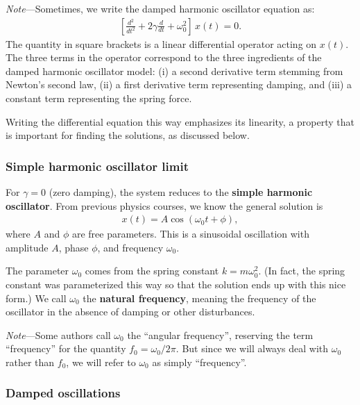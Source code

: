 \documentclass[10pt,a4paper]{article}
\begin{document}
\begin{framed}\noindent
  \textit{Note}---Sometimes, we write the damped harmonic oscillator
  equation as:
  \begin{align}
    \left[\frac{d^2}{dt^2} + 2\gamma \frac{d}{dt} + \omega_0^2 \right]\, x(t) = 0.
  \end{align}
  The quantity in square brackets is a linear differential operator acting on $x(t)$.  The three terms in the operator correspond to the three ingredients of the damped harmonic oscillator model: (i) a second derivative term stemming from Newton's second law, (ii) a first derivative term representing damping, and (iii) a constant term representing the spring force.

  Writing the differential equation this way emphasizes its linearity,
  a property that is important for finding the solutions, as discussed
  below.
\end{framed}

\subsubsection{Simple harmonic oscillator limit}

For $\gamma = 0$ (zero damping), the system reduces to the
\textbf{simple harmonic oscillator}. From previous physics courses, we
know the general solution is
\begin{align}
  x(t) = A \cos(\omega_0 t + \phi),
\end{align}
where $A$ and $\phi$ are free parameters. This is a sinusoidal
oscillation with amplitude $A$, phase $\phi$, and frequency
$\omega_0$.

The parameter $\omega_0$ comes from the spring constant $k =
m\omega_0^2$. (In fact, the spring constant was parameterized this way
so that the solution ends up with this nice form.) We call $\omega_0$
the \textbf{natural frequency}, meaning the frequency of the
oscillator in the absence of damping or other disturbances.

\begin{framed}\noindent
  \textit{Note}---Some authors call $\omega_0$ the ``angular
  frequency'', reserving the term ``frequency'' for the quantity $f_0
  = \omega_0/2\pi$.  But since we will always deal with $\omega_0$
  rather than $f_0$, we will refer to $\omega_0$ as simply
  ``frequency''.
\end{framed}
  
\subsubsection{Damped oscillations}
\label{damped-oscillations}
\end{document}
